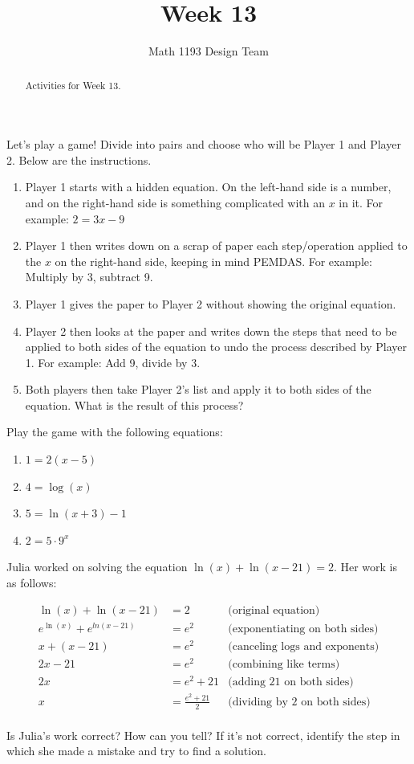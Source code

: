 \documentclass[noauthor,noinstructornotes]{ximera}
\title{Week 13}
\author{Math 1193 Design Team}
\begin{document}
\begin{abstract}
    Activities for Week 13.
\end{abstract}
\maketitle

\begin{problem}
Let's play a game! Divide into pairs and choose who will be
Player 1 and Player 2. Below are the instructions.

\begin{enumerate}
    \item Player 1 starts with a hidden equation. On the left-hand side
    is a number, and on the right-hand side is something complicated
    with an \(x\) in it. For example: \(2 = 3x - 9\)
    \item Player 1 then writes down on a scrap of paper each step/operation
    applied to the \(x\) on the right-hand side, keeping in mind PEMDAS.
    For example: Multiply by 3, subtract 9.
    \item Player 1 gives the paper to Player 2 without showing the original
    equation.
    \item Player 2 then looks at the paper and writes down the steps
    that need to be applied to both sides of the equation to undo
    the process described by Player 1. For example: Add 9, divide by 3.
    \item Both players then take Player 2's list and apply it to both sides
    of the equation. What is the result of this process?
\end{enumerate}

Play the game with the following equations:
\begin{enumerate}
    \item \(1 = 2(x - 5)\)
    \item \(4 = \log(x)\)
    \item \(5 = \ln(x + 3) - 1\)
    \item \(2 = 5 \cdot 9^x\) 
\end{enumerate}
\end{problem}

\begin{problem}
Julia worked on solving the equation \(\ln(x) + \ln(x - 21) = 2\). Her
work is as follows:

\begin{align*}
\ln(x) + \ln(x - 21) & = 2 & \text{(original equation)}\\
e^{\ln(x)} + e^{ln(x - 21)} & = e^2 & \text{(exponentiating on both sides)} \\
x + (x - 21) & = e^2 & \text{(canceling logs and exponents)}\\
2x - 21 & = e^2 & \text{(combining like terms)}\\
2x & = e^2 + 21 & \text{(adding 21 on both sides)}\\
x & = \frac{e^2 + 21}{2} & \text{(dividing by 2 on both sides)}\\
\end{align*}

Is Julia's work correct? How can you tell? If it's not correct, identify
the step in which she made a mistake and try to find a solution.
\end{problem}
\end{document}
